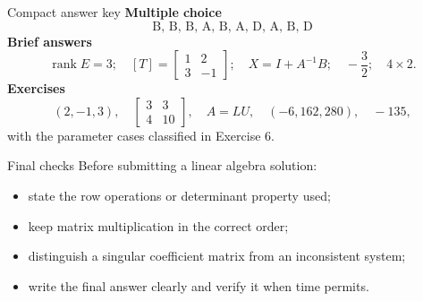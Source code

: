 \documentclass[aspectratio=169]{beamer}
\newcommand{\rank}{\operatorname{rank}}
\begin{document}
\begin{frame}{Compact answer key}
\small
\textbf{Multiple choice}
\[
\boxed{\text{B, B, B, A, B, A, D, A, B, D}}
\]
\textbf{Brief answers}
\[
\rank E=3;\quad
[T]=\begin{bmatrix}1&2\\3&-1\end{bmatrix};\quad
X=I+A^{-1}B;\quad
-\frac32;\quad
4\times2.
\]
\textbf{Exercises}
\[
(2,-1,3),\quad
\begin{bmatrix}3&3\\4&10\end{bmatrix},\quad
A=LU,\quad
(-6,162,280),\quad
-135,
\]
with the parameter cases classified in Exercise 6.
\end{frame}

\begin{frame}{Final checks}
Before submitting a linear algebra solution:
\begin{itemize}
  \item state the row operations or determinant property used;
  \item keep matrix multiplication in the correct order;
  \item distinguish a singular coefficient matrix from an inconsistent system;
  \item write the final answer clearly and verify it when time permits.
\end{itemize}
\end{frame}
\end{document}
